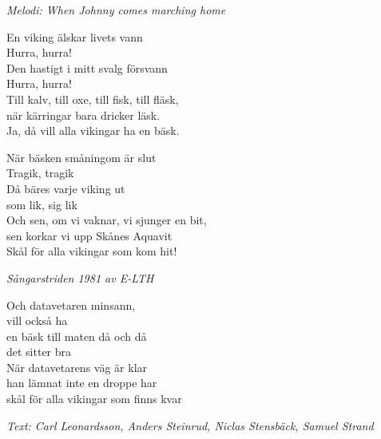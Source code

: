 {\footnotesize\textit{Melodi: When Johnny comes marching home}}\par
\vspace{10pt}
En viking älskar livets vann\\
Hurra, hurra!\\
Den hastigt i mitt svalg försvann\\
Hurra, hurra!\\
Till kalv, till oxe, till fisk, till fläsk,\\
när kärringar bara dricker läsk.\\
Ja, då vill alla vikingar ha en bäsk.\par
\vspace{10pt}
När bäsken småningom är slut\\
Tragik, tragik\\
Då bäres varje viking ut\\
som lik, sig lik\\
Och sen, om vi vaknar, vi sjunger en bit,\\
sen korkar vi upp Skånes Aquavit\\
Skål för alla vikingar som kom hit!\par
\vspace{10pt}
{\footnotesize\textit{Sångarstriden 1981 av E-LTH}}\par
\vspace{10pt}
Och datavetaren minsann,\\
vill också ha\\
en bäsk till maten då och då\\
det sitter bra\\
När datavetarens väg är klar\\
han lämnat inte en droppe har\\
skål för alla vikingar som finns kvar\par
\vspace{10pt}
{\footnotesize\textit{Text: Carl Leonardsson, Anders Steinrud, Niclas Stensbäck, Samuel Strand}}
